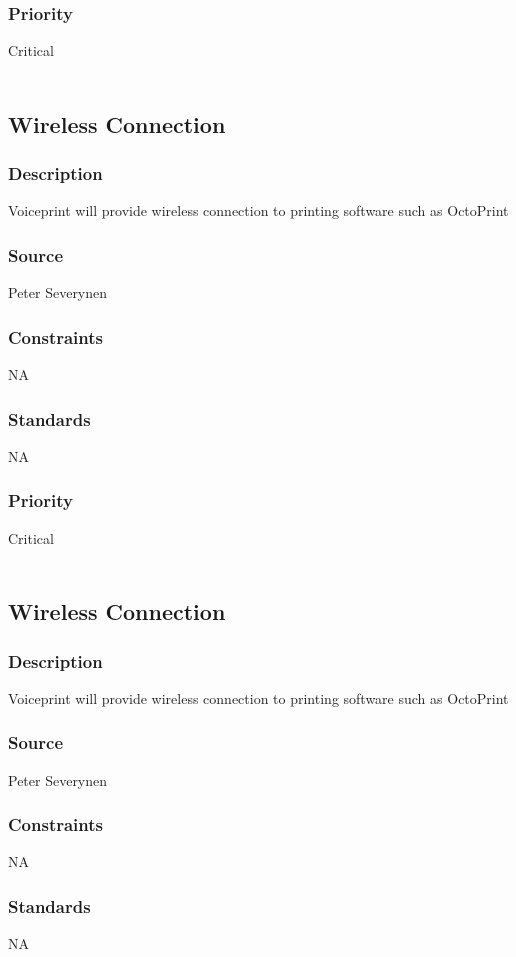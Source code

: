 \subsubsection{Priority}
Critical \\
\\
\subsection{Wireless Connection}
\subsubsection{Description}
Voiceprint will provide wireless connection to printing software such as OctoPrint
\subsubsection{Source}
Peter Severynen
\subsubsection{Constraints}
NA
\subsubsection{Standards}
NA
\subsubsection{Priority}
Critical \\
\\
\subsection{Wireless Connection}
\subsubsection{Description}
Voiceprint will provide wireless connection to printing software such as OctoPrint
\subsubsection{Source}
Peter Severynen
\subsubsection{Constraints}
NA
\subsubsection{Standards}
NA
